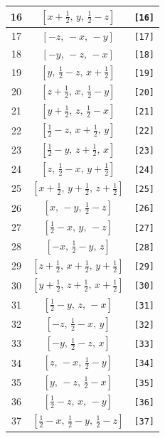 \documentclass[fleqn,8pt]{jsarticle}
\begin{document}
\begin{longtable}{ccc}
16 & $\left[ x + \frac{1}{2},\, y,\, \frac{1}{2} - z \right]$ & {\tt [16]} \\ \hline
17 & $\left[ - z,\, - x,\, - y \right]$ & {\tt [17]} \\ \hline
18 & $\left[ - y,\, - z,\, - x \right]$ & {\tt [18]} \\ \hline
19 & $\left[ y,\, \frac{1}{2} - z,\, x + \frac{1}{2} \right]$ & {\tt [19]} \\ \hline
20 & $\left[ z + \frac{1}{2},\, x,\, \frac{1}{2} - y \right]$ & {\tt [20]} \\ \hline
21 & $\left[ y + \frac{1}{2},\, z,\, \frac{1}{2} - x \right]$ & {\tt [21]} \\ \hline
22 & $\left[ \frac{1}{2} - z,\, x + \frac{1}{2},\, y \right]$ & {\tt [22]} \\ \hline
23 & $\left[ \frac{1}{2} - y,\, z + \frac{1}{2},\, x \right]$ & {\tt [23]} \\ \hline
24 & $\left[ z,\, \frac{1}{2} - x,\, y + \frac{1}{2} \right]$ & {\tt [24]} \\ \hline
25 & $\left[ x + \frac{1}{2},\, y + \frac{1}{2},\, z + \frac{1}{2} \right]$ & {\tt [25]} \\ \hline
26 & $\left[ x,\, - y,\, \frac{1}{2} - z \right]$ & {\tt [26]} \\ \hline
27 & $\left[ \frac{1}{2} - x,\, y,\, - z \right]$ & {\tt [27]} \\ \hline
28 & $\left[ - x,\, \frac{1}{2} - y,\, z \right]$ & {\tt [28]} \\ \hline
29 & $\left[ z + \frac{1}{2},\, x + \frac{1}{2},\, y + \frac{1}{2} \right]$ & {\tt [29]} \\ \hline
30 & $\left[ y + \frac{1}{2},\, z + \frac{1}{2},\, x + \frac{1}{2} \right]$ & {\tt [30]} \\ \hline
31 & $\left[ \frac{1}{2} - y,\, z,\, - x \right]$ & {\tt [31]} \\ \hline
32 & $\left[ - z,\, \frac{1}{2} - x,\, y \right]$ & {\tt [32]} \\ \hline
33 & $\left[ - y,\, \frac{1}{2} - z,\, x \right]$ & {\tt [33]} \\ \hline
34 & $\left[ z,\, - x,\, \frac{1}{2} - y \right]$ & {\tt [34]} \\ \hline
35 & $\left[ y,\, - z,\, \frac{1}{2} - x \right]$ & {\tt [35]} \\ \hline
36 & $\left[ \frac{1}{2} - z,\, x,\, - y \right]$ & {\tt [36]} \\ \hline
37 & $\left[ \frac{1}{2} - x,\, \frac{1}{2} - y,\, \frac{1}{2} - z \right]$ & {\tt [37]} \\ \hline

\end{longtable}
\end{document}
